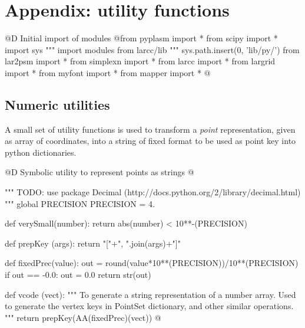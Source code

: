 \documentclass[11pt,oneside]{article}	%
\begin{document}
\appendix
\section{Appendix: utility functions}
@D Initial import of modules
@{from pyplasm import *
from scipy import *
import sys
""" import modules from larcc/lib """
sys.path.insert(0, 'lib/py/')
from lar2psm import *
from simplexn import *
from larcc import *
from largrid import *
from myfont import *
from mapper import *
@}
\subsection{Numeric utilities}

A small set of utility functions is used to transform a \emph{point} representation, given as array of coordinates, into a string of fixed format to be used as point key into python dictionaries.

@D Symbolic utility to represent points as strings
@{""" TODO: use package Decimal (http://docs.python.org/2/library/decimal.html) """
global PRECISION
PRECISION = 4.

def verySmall(number): return abs(number) < 10**-(PRECISION)

def prepKey (args): return "["+", ".join(args)+"]"

def fixedPrec(value):
	out = round(value*10**(PRECISION))/10**(PRECISION)
	if out == -0.0: out = 0.0
	return str(out)
	
def vcode (vect): 
	"""
	To generate a string representation of a number array.
	Used to generate the vertex keys in PointSet dictionary, and other similar operations.
	"""
	return prepKey(AA(fixedPrec)(vect))
@}




\end{document}

